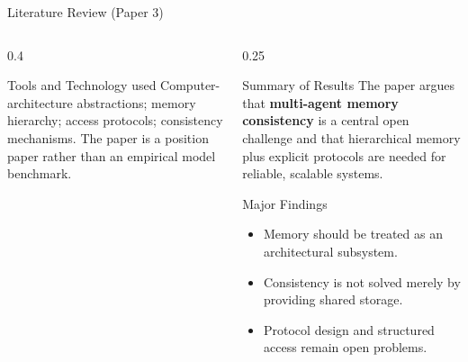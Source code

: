 \begin{frame}{Literature Review (Paper 3)}
\begin{columns}[T]
\begin{column}{0.4\textwidth}
    \begin{block}{Tools and Technology used}
      \tiny Computer-architecture abstractions; memory hierarchy; access protocols; consistency mechanisms. The paper is a position paper rather than an empirical model benchmark.
    \end{block}
  \end{column}

  \begin{column}{0.25\textwidth}
    \begin{block}{Summary of Results}
      \tiny The paper argues that \textbf{multi-agent memory consistency} is a central open challenge and that hierarchical memory plus explicit protocols are needed for reliable, scalable systems.
    \end{block}
    \vspace{0.12cm}
    \begin{block}{Major Findings}
      \tiny
      \begin{itemize}\setlength\itemsep{1pt}
      \item Memory should be treated as an architectural subsystem.
\item Consistency is not solved merely by providing shared storage.
\item Protocol design and structured access remain open problems.
      \end{itemize}
    \end{block}
  \end{column}
  \end{columns}
\end{frame}
